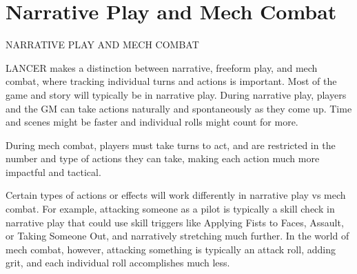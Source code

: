 \chapter{Narrative Play and Mech Combat}
                          NARRATIVE PLAY AND MECH COMBAT

LANCER makes a distinction between narrative, freeform play, and mech combat, where tracking
individual turns and actions is important. Most of the game and story will typically be in narrative
play. During narrative play, players and the GM can take actions naturally and spontaneously as
they come up. Time and scenes might be faster and individual rolls might count for more.

	        During mech combat, players must take turns to act, and are restricted in the number
and type of actions they can take, making each action much more impactful and tactical.

	        Certain types of actions or effects will work differently in narrative play vs mech combat.
For example, attacking someone as a pilot is typically a skill check in narrative play that could
use skill triggers like Applying Fists to Faces, Assault, or Taking Someone Out, and narratively
stretching much further. In the world of mech combat, however, attacking something is typically
an attack roll, adding grit, and each individual roll accomplishes much less.